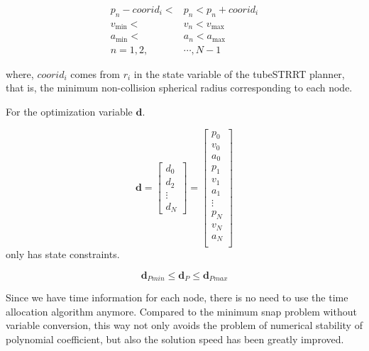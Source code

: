 \documentclass[times,authoryear]{elsarticle}
\begin{document}
\begin{equation}
	\begin{align}
		p_{n}-coorid_{i}<&p_n<p_{n}+coorid_{i}  \\
		v_{\min}<&v_n<v_{\max}  \\ 
		a_{\min}<&a_n<a_{\max}  \\ 
		n = 1,2,&\cdots,N-1
	\end{align}
\end{equation}

where, $coorid_{i}$ comes from $r_{i}$ in the state variable of the tubeSTRRT planner, that is, the minimum non-collision spherical radius corresponding to each node. 

For the optimization variable $\boldsymbol{d}$.

\begin{equation}
	\boldsymbol{d} = \begin{bmatrix}
		d_{0}  \\
		d_{2} \\
		\vdots \\
		d_{N}
		\end{bmatrix}
		 = 
		 \begin{bmatrix}
		p_{0} \\
		v_{0} \\
		a_{0} \\
		p_{1} \\
		v_{1} \\
		a_{1}  \\
		\vdots \\ 
		p_{N} \\
		v_{N} \\
		a_{N}  \\
	\end{bmatrix}
\end{equation}
only has state constraints.

\begin{equation}
	\boldsymbol{d}_{Pmin} \leq \boldsymbol{d}_{P}  \leq \boldsymbol{d}_{Pmax}
\end{equation}

Since we have time information for each node, there is no need to use the time allocation algorithm anymore.
Compared to the minimum snap problem without variable conversion, this way not only avoids the problem of numerical stability of polynomial coefficient, but also the solution speed has been greatly improved.

\end{document}
